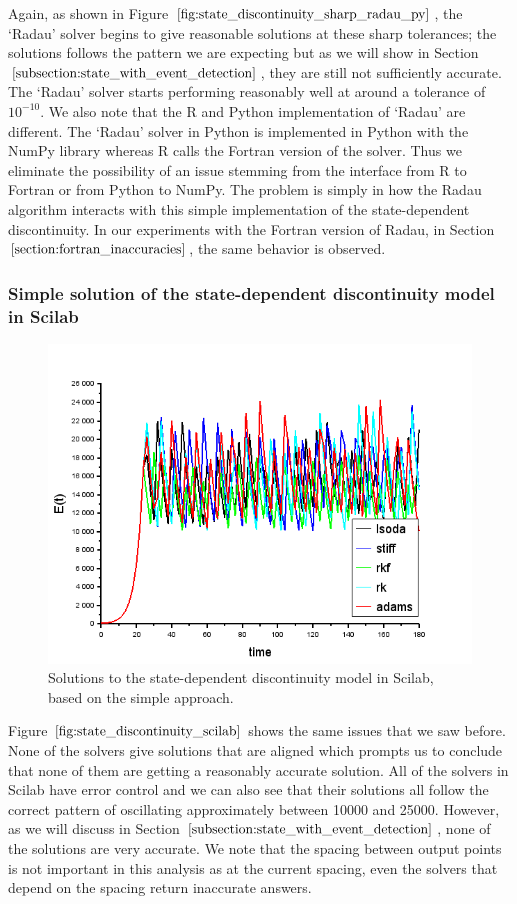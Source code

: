 Again, as shown in Figure $\ref{fig:state_discontinuity_sharp_radau_py}$, the `Radau' solver begins to give reasonable solutions at these sharp tolerances; the solutions follows the pattern we are expecting but as we will show in Section $\ref{subsection:state_with_event_detection}$, they are still not sufficiently accurate. The `Radau' solver starts performing reasonably well at around a tolerance of $10^{-10}$. We also note that the R and Python implementation of `Radau' are different. The `Radau' solver in Python is implemented in Python with the NumPy library whereas R calls the Fortran version of the solver. Thus we eliminate the possibility of an issue stemming from the interface from R to Fortran or from Python to NumPy. The problem is simply in how the Radau algorithm interacts with this simple implementation of the state-dependent discontinuity. In our experiments with the Fortran version of Radau, in Section $\ref{section:fortran_inaccuracies}$, the same behavior is observed.

\subsubsection{Simple solution of the state-dependent discontinuity model in Scilab}
\begin{figure}[H]
\centering
\includegraphics[width=0.7\linewidth]{./figures/state_discontinuity_scilab}
\caption{Solutions to the state-dependent discontinuity model in Scilab, based on the simple approach.}
\label{fig:state_discontinuity_scilab}
\end{figure}

Figure $\ref{fig:state_discontinuity_scilab}$ shows the same issues that we saw before. None of the solvers give solutions that are aligned which prompts us to conclude that none of them are getting a reasonably accurate solution. All of the solvers in Scilab have error control and we can also see that their solutions all follow the correct pattern of oscillating approximately between 10000 and 25000. However, as we will discuss in Section $\ref{subsection:state_with_event_detection}$, none of the solutions are very accurate. We note that the spacing between output points is not important in this analysis as at the current spacing, even the solvers that depend on the spacing return inaccurate answers.

